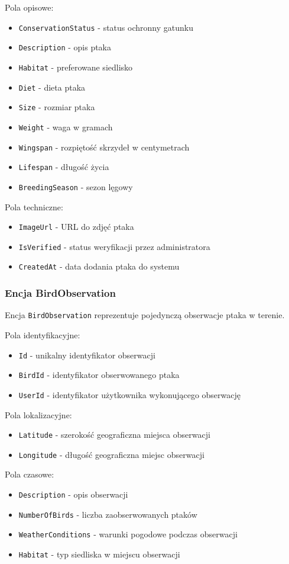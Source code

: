 Pola opisowe:
\begin{itemize}
	\item \texttt{ConservationStatus} - status ochronny gatunku
	\item \texttt{Description} - opis ptaka
	\item \texttt{Habitat} - preferowane siedlisko
	\item \texttt{Diet} - dieta ptaka
	\item \texttt{Size} - rozmiar ptaka
	\item \texttt{Weight} - waga w gramach
	\item \texttt{Wingspan} - rozpiętość skrzydeł w centymetrach
	\item \texttt{Lifespan} - długość życia
	\item \texttt{BreedingSeason} - sezon lęgowy
\end{itemize}

Pola techniczne:
\begin{itemize}
	\item \texttt{ImageUrl} - URL do zdjęć ptaka
	\item \texttt{IsVerified} - status weryfikacji przez administratora
	\item \texttt{CreatedAt} - data dodania ptaka do systemu
\end{itemize}

\subsubsection{Encja BirdObservation}
Encja \texttt{BirdObservation} reprezentuje pojedynczą obserwacje ptaka w terenie.

Pola identyfikacyjne:
\begin{itemize}
	\item \texttt{Id} - unikalny identyfikator obserwacji
	\item \texttt{BirdId} - identyfikator obserwowanego ptaka
	\item \texttt{UserId} - identyfikator użytkownika wykonującego obserwację
\end{itemize}

Pola lokalizacyjne:
\begin{itemize}
	\item \texttt{Latitude} - szerokość geograficzna miejsca obserwacji
	\item \texttt{Longitude} - długość geograficzna miejsc obserwacji
\end{itemize}

Pola czasowe:
\begin{itemize}
	\item \texttt{Description} - opis obserwacji
	\item \texttt{NumberOfBirds} - liczba zaobserwowanych ptaków
	\item \texttt{WeatherConditions} - warunki pogodowe podczas obserwacji
	\item \texttt{Habitat} - typ siedliska w miejscu obserwacji
\end{itemize}

